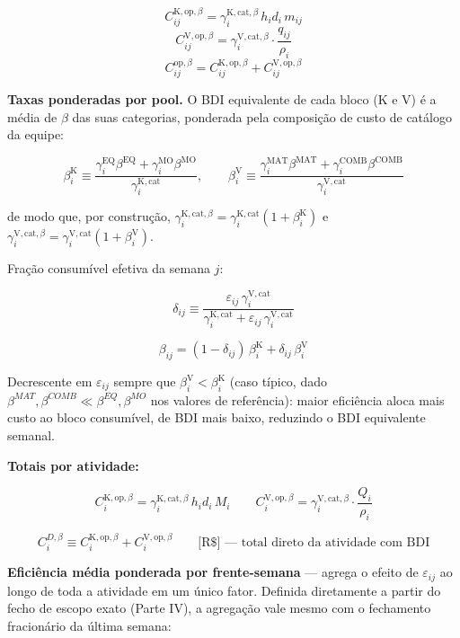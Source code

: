 \documentclass[
  10pt,
]{article}
\begin{document}
\[C_{ij}^{\mathrm{K,op},\beta} = \gamma_i^{\mathrm{K,cat},\beta}\,h_id_i\,m_{ij}\]
\[C_{ij}^{\mathrm{V,op},\beta} = \gamma_i^{\mathrm{V,cat},\beta}\cdot\frac{q_{ij}}{\rho_i}\]
\[C_{ij}^{\mathrm{op},\beta} = C_{ij}^{\mathrm{K,op},\beta}+C_{ij}^{\mathrm{V,op},\beta}\]

\textbf{Taxas ponderadas por pool.} O BDI equivalente de cada bloco (K e
V) é a média de \(\beta\) das suas categorias, ponderada pela composição
de custo de catálogo da equipe:

\[\beta_i^{\mathrm K} \equiv \frac{\gamma_i^{\mathrm{EQ}}\beta^{\mathrm{EQ}}+\gamma_i^{\mathrm{MO}}\beta^{\mathrm{MO}}}{\gamma_i^{\mathrm{K,cat}}}, \qquad \beta_i^{\mathrm V} \equiv \frac{\gamma_i^{\mathrm{MAT}}\beta^{\mathrm{MAT}}+\gamma_i^{\mathrm{COMB}}\beta^{\mathrm{COMB}}}{\gamma_i^{\mathrm{V,cat}}}\]

de modo que, por construção,
\(\gamma_i^{\mathrm{K,cat},\beta}=\gamma_i^{\mathrm{K,cat}}(1+\beta_i^{\mathrm K})\)
e
\(\gamma_i^{\mathrm{V,cat},\beta}=\gamma_i^{\mathrm{V,cat}}(1+\beta_i^{\mathrm V})\).

Fração consumível efetiva da semana \(j\):

\[\delta_{ij} \equiv \frac{\varepsilon_{ij}\,\gamma_i^{\mathrm{V,cat}}}{\gamma_i^{\mathrm{K,cat}}+\varepsilon_{ij}\,\gamma_i^{\mathrm{V,cat}}}\]

\[\boxed{\beta_{ij} = (1-\delta_{ij})\,\beta_i^{\mathrm K} + \delta_{ij}\,\beta_i^{\mathrm V}}\]

Decrescente em \(\varepsilon_{ij}\) sempre que
\(\beta_i^{\mathrm V}<\beta_i^{\mathrm K}\) (caso típico, dado
\(\beta^{MAT},\beta^{COMB}\ll\beta^{EQ},\beta^{MO}\) nos valores de
referência): maior eficiência aloca mais custo ao bloco consumível, de
BDI mais baixo, reduzindo o BDI equivalente semanal.

\textbf{Totais por atividade:}

\[C_i^{\mathrm{K,op},\beta} = \gamma_i^{\mathrm{K,cat},\beta}\,h_id_i\,M_i \qquad C_i^{\mathrm{V,op},\beta} = \gamma_i^{\mathrm{V,cat},\beta}\cdot\frac{Q_i}{\rho_i}\]

\[C_i^{D,\beta} \equiv C_i^{\mathrm{K,op},\beta}+C_i^{\mathrm{V,op},\beta} \qquad\text{[R\$] — total direto da atividade com BDI}\]

\textbf{Eficiência média ponderada por frente-semana} --- agrega o
efeito de \(\varepsilon_{ij}\) ao longo de toda a atividade em um único
fator. Definida diretamente a partir do fecho de escopo exato (Parte
IV), a agregação vale mesmo com o fechamento fracionário da última
semana:
\end{document}
